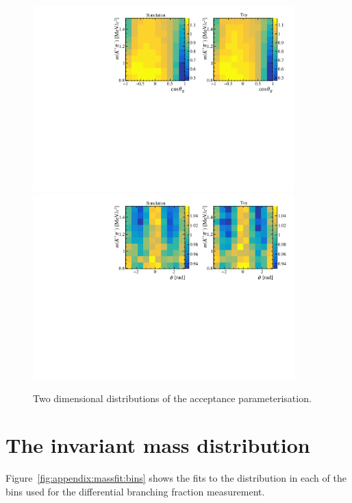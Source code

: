 \begin{figure}[!tb]
 \centering
 \includegraphics[width=0.9\textwidth]{figs/kpimm/acceptance/2d/ctk_mkpi.pdf}
 \includegraphics[width=0.9\textwidth]{figs/kpimm/acceptance/2d/phi_mkpi.pdf}
 \caption{Two dimensional distributions of the acceptance parameterisation.}
 \label{fig:acceptance:2d_4}
\end{figure}

\clearpage
\section{The \kpimm invariant mass distribution}
\label{sec:appendix:massfit}

Figure~\ref{fig:appendix:massfit:bins} shows the fits to the \mkpimm distribution in each of the \qsq bins used for the differential branching fraction measurement.
 
